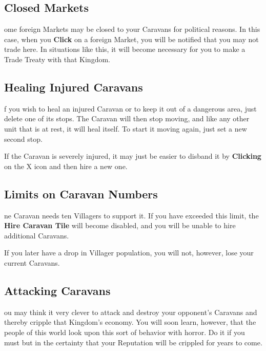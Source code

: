 \subsection{\textsf{Closed Markets}}


ome foreign Markets may be closed to your Caravans for political reasons. In this case, when you \textbf{Click} on a foreign Market, you will be notified that you may not trade here. In situations like this, it will become necessary for you to make a Trade Treaty with that Kingdom.

\subsection{\textsf{Healing Injured Caravans}}


f you wish to heal an injured Caravan or to keep it out of a dangerous area, just delete one of its stops. The Caravan will then stop moving, and like any other unit that is at rest, it will heal itself. To start it moving again, just set a new second stop.


If the Caravan is severely injured, it may just be easier to disband it by \textbf{Clicking} on the X icon and then hire a new one.

\subsection{\textsf{Limits on Caravan Numbers}}


ne Caravan needs ten Villagers to support it. If you have exceeded this limit, the \textbf{Hire Caravan Tile} will become disabled, and you will be unable to hire additional Caravans.

If you later have a drop in Villager population, you will not, however, lose your current Caravans.

\subsection{\textsf{Attacking Caravans}}


ou may think it very clever to attack and destroy your opponent’s Caravans and thereby cripple that Kingdom's economy. You will soon learn, however, that the people of this world look upon this sort of behavior with horror. Do it if you must but in the certainty that your Reputation will be crippled for years to come.

